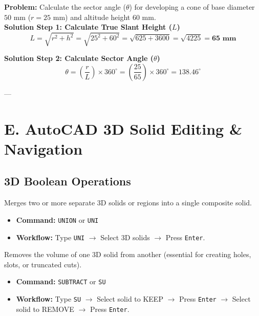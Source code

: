 \begin{example}
\textbf{Problem:} Calculate the sector angle ($\theta$) for developing a cone of base diameter $50\text{ mm}$ ($r = 25\text{ mm}$) and altitude height $60\text{ mm}$.\\[4pt]
\textbf{Solution Step 1: Calculate True Slant Height ($L$)}
$$L = \sqrt{r^2 + h^2} = \sqrt{25^2 + 60^2} = \sqrt{625 + 3600} = \sqrt{4225} = \mathbf{65\text{ mm}}$$

\noindent \textbf{Solution Step 2: Calculate Sector Angle ($\theta$)}
$$\theta = \left( \frac{r}{L} \right) \times 360^\circ = \left( \frac{25}{65} \right) \times 360^\circ = \mathbf{138.46^\circ}$$
\end{example}

---

\section{E. AutoCAD 3D Solid Editing \& Navigation}

\subsection{3D Boolean Operations}

\begin{autocadcmd}[UNION]
Merges two or more separate 3D solids or regions into a single composite solid.
\begin{itemize}
    \item \textbf{Command:} \texttt{UNION} or \texttt{UNI}
    \item \textbf{Workflow:} Type \texttt{UNI} $\to$ Select 3D solids $\to$ Press \texttt{Enter}.
\end{itemize}
\end{autocadcmd}

\begin{autocadcmd}[SUBTRACT]
Removes the volume of one 3D solid from another (essential for creating holes, slots, or truncated cuts).
\begin{itemize}
    \item \textbf{Command:} \texttt{SUBTRACT} or \texttt{SU}
    \item \textbf{Workflow:} Type \texttt{SU} $\to$ Select solid to KEEP $\to$ Press \texttt{Enter} $\to$ Select solid to REMOVE $\to$ Press \texttt{Enter}.
\end{itemize}
\end{autocadcmd}

